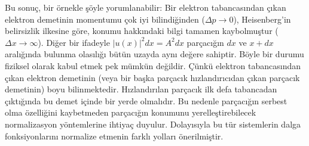 \documentclass[00_kitap.tex]{subfiles}
\begin{document}
Bu sonuç, bir örnekle şöyle yorumlanabilir: Bir elektron tabancasından çıkan elektron demetinin momentumu çok iyi bilindiğinden ($\Delta p \rightarrow 0$), Heisenberg'in belirsizlik ilkesine göre, konumu hakkındaki bilgi tamamen kaybolmuştur ($\Delta x \rightarrow \infty$). Diğer bir ifadeyle $|u(x)|^2 dx = A^2 dx$ parçacığın $dx$ ve $x+dx$ aralığında bulunma olasılığı bütün uzayda aynı değere sahiptir. 
Böyle bir durumu fiziksel olarak kabul etmek pek mümkün değildir. Çünkü elektron tabancasından çıkan elektron demetinin (veya bir başka parçacık hızlandırıcıdan çıkan parçacık demetinin) boyu bilinmektedir. Hızlandırılan parçacık ilk defa tabancadan çıktığında bu demet içinde bir yerde olmalıdır. Bu nedenle parçacığın serbest olma özelliğini kaybetmeden parçacığın konumunu yerelleştirebilecek normalizasyon yöntemlerine ihtiyaç duyulur. Dolayısıyla bu tür sistemlerin dalga fonksiyonlarını normalize etmenin farklı yolları önerilmiştir.
\end{document}

